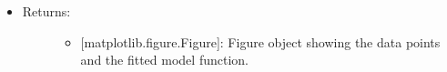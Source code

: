 \documentclass[letterpaper,10pt,english]{sphinxmanual}
\begin{document}
\begin{fulllineitems}
\begin{fulllineitems}
\begin{itemize}
\begin{description}
\begin{itemize}
\end{itemize}

\end{description}

\item {} \begin{description}
\item[{Returns:}] \leavevmode\begin{itemize}
\item {} 
{[}matplotlib.figure.Figure{]}: Figure object showing the data
points and the fitted model function.

\end{itemize}

\end{description}

\end{itemize}

\end{fulllineitems}


\end{fulllineitems}

\end{document}

